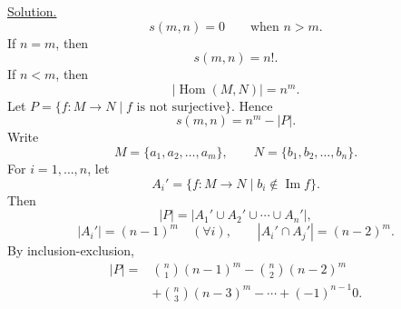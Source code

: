 \noindent\underline{Solution.}
\[
 s(m,n)=0\qquad\text{when }n>m.
\]
\noindent If $n=m$, then
\[
 s(m,n)=n!.
\]
\noindent If $n<m$, then
\[
 |\operatorname{Hom}(M,N)|=n^m.
\]
\noindent Let $P=\{f:M\longrightarrow N\mid f\text{ is not surjective}\}$.
Hence
\[
 s(m,n)=n^m-|P|.
\]
\noindent Write
\[
 M=\{a_1,a_2,\ldots,a_m\},\qquad
 N=\{b_1,b_2,\ldots,b_n\}.
\]
\noindent For $i=1,\ldots,n$, let
\[
 A_i'=\{f:M\longrightarrow N\mid b_i\notin\operatorname{Im}f\}.
\]
\noindent Then
\[
 |P|=\bigl|A_1'\cup A_2'\cup\cdots\cup A_n'\bigr|,
\]
\[
 |A_i'|=(n-1)^m\quad(\forall i),\qquad
 |A_i'\cap A_j'|=(n-2)^m.
\]
\noindent By inclusion-exclusion,
\[
\begin{aligned}
 |P|={}&\binom{n}{1}(n-1)^m
       -\binom{n}{2}(n-2)^m\\
      &+\binom{n}{3}(n-3)^m-\cdots
       +(-1)^{n-1}0.
\end{aligned}
\]
